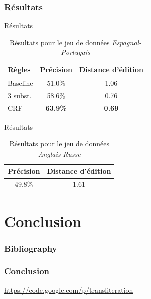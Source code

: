 \documentclass{beamer}
\begin{document}
\begin{frame}
\frametitle{Résultats}
\begin{block}{Résultats}
\begin{center}
\begin{table}[H]
\caption{Résultats pour le jeu de données \emph{Espagnol-Portugais} }
\begin{tabular}{|l|c|c|}
\hline
Règles&Précision&Distance d'édition\\
\hline
Baseline&51.0\%&1.06\\
\hline
3 subst.&58.6\%&0.76\\
\hline
CRF&\textbf{63.9\%}&\textbf{0.69}\\
\hline
\end{tabular}
\end{table}
\end{center}
\end{block}

\begin{block}{Résultats}
\begin{center}
\begin{table}[H]
\caption{Résultats pour le jeu de données \emph{Anglais-Russe} }
\begin{center}
\begin{tabular}{|c|c|}
\hline
Précision&Distance d'édition\\
\hline
49.8\%&1.61\\
\hline
\end{tabular}
\end{center}
\end{table}
\end{center}
\end{block}

\end{frame}

\section{Conclusion}
\begin{frame}
\tableofcontents[currentsection]
\end{frame}
\begin{frame}
    \frametitle{Bibliography}
    {\fontsize{0.8em}{1em}
    \nocite{*}
    
    }
\end{frame}

\begin{frame}
    \frametitle{Conclusion}
    \url{https://code.google.com/p/transliteration}
\end{frame}
\end{document}

